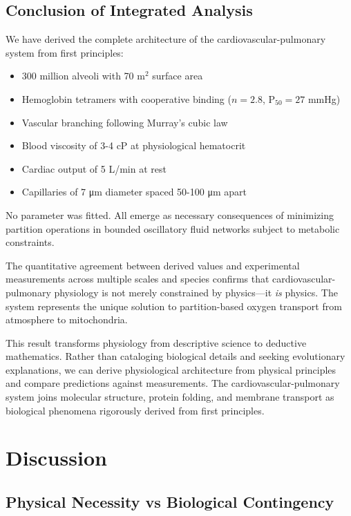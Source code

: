 \documentclass[12pt,a4paper]{article}
\theoremstyle{remark}
\begin{document}
\subsection{Conclusion of Integrated Analysis}

We have derived the complete architecture of the cardiovascular-pulmonary system from first principles:

\begin{itemize}
\item 300 million alveoli with 70 m$^{2}$ surface area
\item Hemoglobin tetramers with cooperative binding ($n = 2.8$, P$_{50} = 27$ mmHg)
\item Vascular branching following Murray's cubic law
\item Blood viscosity of 3-4 cP at physiological hematocrit
\item Cardiac output of 5 L/min at rest
\item Capillaries of 7 μm diameter spaced 50-100 μm apart
\end{itemize}

No parameter was fitted. All emerge as necessary consequences of minimizing partition operations in bounded oscillatory fluid networks subject to metabolic constraints.

The quantitative agreement between derived values and experimental measurements across multiple scales and species confirms that cardiovascular-pulmonary physiology is not merely constrained by physics—it \textit{is} physics. The system represents the unique solution to partition-based oxygen transport from atmosphere to mitochondria.

This result transforms physiology from descriptive science to deductive mathematics. Rather than cataloging biological details and seeking evolutionary explanations, we can derive physiological architecture from physical principles and compare predictions against measurements. The cardiovascular-pulmonary system joins molecular structure, protein folding, and membrane transport as biological phenomena rigorously derived from first principles.

\section{Discussion}

\subsection{Physical Necessity vs Biological Contingency}
\end{document}
